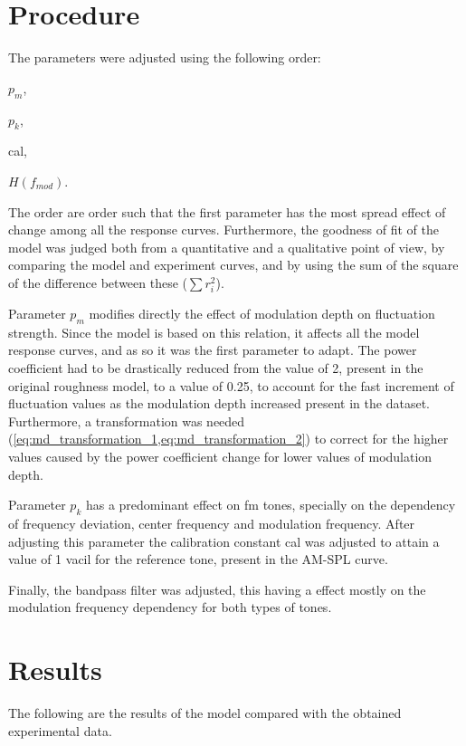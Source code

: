 \documentclass[../main.tex]{subfiles}
\begin{document}
\begin{modelchapter}
\section{Procedure}

The parameters were adjusted using the following order:
\begin{inparaenum}[(1)]
  \item $p_m$,
  \item $p_k$,
  \item cal,
  \item $H(f_{mod})$.
\end{inparaenum}
The order are order such that the first parameter has the most spread effect
of change among all the response curves. Furthermore, the goodness of fit of the
model was judged both from a quantitative and a qualitative point of view, by
comparing the model and experiment curves, and by using the sum of the square of
the difference between these ($\sum r_i^2$).

Parameter $p_m$ modifies directly the effect of modulation depth on fluctuation
strength. Since the model is based on this relation, it affects all the model
response curves, and as so it was the first parameter to adapt. The power
coefficient had to be drastically reduced from the value of 2, present in the
original roughness model, to a value of 0.25, to account for the fast increment
of fluctuation values as the modulation depth increased present in the dataset.
Furthermore, a transformation was needed
(\cref{eq:md_transformation_1,eq:md_transformation_2}) to correct for the higher
values caused by the power coefficient change for lower values of
modulation depth.

Parameter $p_k$ has a predominant effect on \gls{fm} tones, specially on the
dependency of frequency deviation, center frequency and modulation frequency.
After adjusting this parameter the calibration constant cal was adjusted to
attain a value of 1 vacil for the reference tone, present in the AM-SPL curve.

Finally, the bandpass filter was adjusted, this having a effect mostly on the
modulation frequency dependency for both types of tones.

\section{Results}

The following are the results of the model compared with the obtained
experimental data.


\end{modelchapter}
\end{document}
